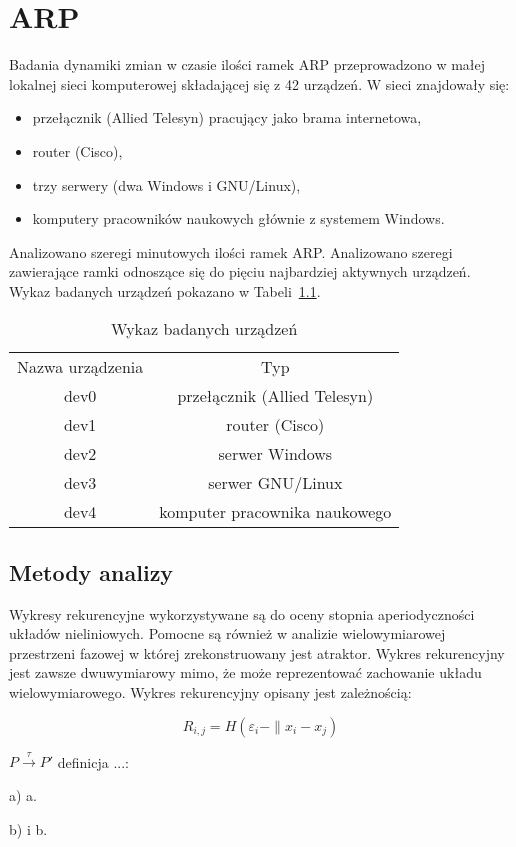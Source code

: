 \chapter{ARP}
Badania dynamiki zmian w czasie ilości ramek ARP przeprowadzono w małej lokalnej sieci komputerowej składającej się z 42 urządzeń. W sieci znajdowały się:
\begin{itemize}
    \item przełącznik (Allied Telesyn) pracujący jako brama internetowa, 
    \item router (Cisco),
    \item trzy serwery (dwa Windows i GNU/Linux),
    \item komputery pracowników naukowych głównie z systemem Windows.
\end{itemize}
Analizowano szeregi minutowych ilości ramek ARP. Analizowano szeregi zawierające ramki odnoszące się do pięciu najbardziej aktywnych urządzeń. Wykaz badanych urządzeń pokazano w Tabeli~\ref{tab:Wbu}.

\begin{table}[t]
\centering
\begin{tabular}{|c|c|}
\cline{1-2}
Nazwa urządzenia & Typ\\
\cline{1-2}
dev0	& przełącznik (Allied Telesyn)\\\cline{1-2}
dev1	& router (Cisco)\\\cline{1-2}
dev2	& serwer Windows\\\cline{1-2}
dev3	& serwer GNU/Linux\\\cline{1-2}
dev4	& komputer pracownika naukowego\\\cline{1-2}
\end{tabular}
\caption{Wykaz badanych urządzeń}
\label{tab:Wbu}
\end{table}

\section{Metody analizy}
Wykresy rekurencyjne wykorzystywane są do oceny stopnia aperiodyczności układów nieliniowych. Pomocne są również w analizie wielowymiarowej przestrzeni fazowej w której zrekonstruowany jest atraktor. Wykres rekurencyjny jest zawsze dwuwymiarowy mimo, że może reprezentować zachowanie układu wielowymiarowego. Wykres rekurencyjny opisany jest zależnością:

\begin{equation}
    R_{i,j}= H(\varepsilon_i-\|x_i-x_j)
\end{equation}

\begin{defi}
$P\stackrel{\tau}{\rightarrow}P'$ definicja ...:
\begin{list}{}{}
    \item[a)] a.
    \item[b)] i b.
\end{list}
\label{nazwa}
\end{defi}
